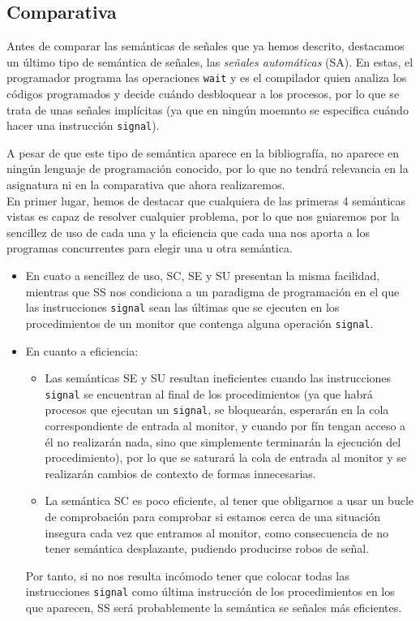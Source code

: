 \subsection{Comparativa}
Antes de comparar las semánticas de señales que ya hemos descrito, destacamos un último tipo de semántica de señales, las \textit{señales automáticas} (SA). En estas, el programador programa las operaciones \verb|wait| y es el compilador quien analiza los códigos programados y decide cuándo desbloquear a los procesos, por lo que se trata de unas señales implícitas (ya que en ningún moemnto se especifica cuándo hacer una instrucción \verb|signal|). 

A pesar de que este tipo de semántica aparece en la bibliografía, no aparece en ningún lenguaje de programación conocido, por lo que no tendrá relevancia en la asignatura ni en la comparativa que ahora realizaremos.\\

En primer lugar, hemos de destacar que cualquiera de las primeras 4 semánticas vistas es capaz de resolver cualquier problema, por lo que nos guiaremos por la sencillez de uso de cada una y la eficiencia que cada una nos aporta a los programas concurrentes para elegir una u otra semántica.
\begin{itemize}
    \item En cuato a sencillez de uso, SC, SE y SU presentan la misma facilidad, mientras que SS nos condiciona a un paradigma de programación en el que las instrucciones \verb|signal| sean las últimas que se ejecuten en los procedimientos de un monitor que contenga alguna operación \verb|signal|.
    \item En cuanto a eficiencia:
        \begin{itemize}
            \item Las semánticas SE y SU resultan ineficientes cuando las instrucciones \verb|signal| se encuentran al final de los procedimientos (ya que habrá procesos que ejecutan un \verb|signal|, se bloquearán, esperarán en la cola correspondiente de entrada al monitor, y cuando por fín tengan acceso a él no realizarán nada, sino que simplemente terminarán la ejecución del procedimiento), por lo que se saturará la cola de entrada al monitor y se realizarán cambios de contexto de formas innecesarias.
            \item La semántica SC es poco eficiente, al tener que obligarnos a usar un bucle de comprobación para comprobar si estamos cerca de una situación insegura cada vez que entramos al monitor, como consecuencia de no tener semántica desplazante, pudiendo producirse robos de señal.
        \end{itemize}
        Por tanto, si no nos resulta incómodo tener que colocar todas las instrucciones \verb|signal| como última instrucción de los procedimientos en los que aparecen, SS será probablemente la semántica se señales más eficientes.
\end{itemize}

